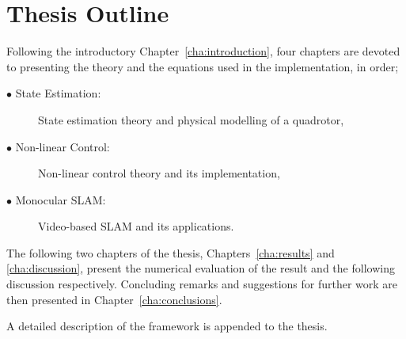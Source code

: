 \section{Thesis Outline}
    Following the introductory Chapter~\ref{cha:introduction}, four chapters
    are devoted to presenting the theory and the equations used in the implementation, in order;
    \begin{description}
        \item[$\bullet$ State Estimation:] State estimation theory and physical modelling of a quadrotor,
        \item[$\bullet$ Non-linear Control:]  Non-linear control theory and its implementation,
        \item[$\bullet$ Monocular SLAM:] Video-based SLAM and its applications.
    \end{description}

    The following two chapters of the thesis, Chapters~\ref{cha:results} and \ref{cha:discussion}, present the
    numerical evaluation of the result and the following discussion respectively.
    Concluding remarks and suggestions for further work are then presented in Chapter~\ref{cha:conclusions}.

    A detailed description of the \crap framework is appended to the thesis.
